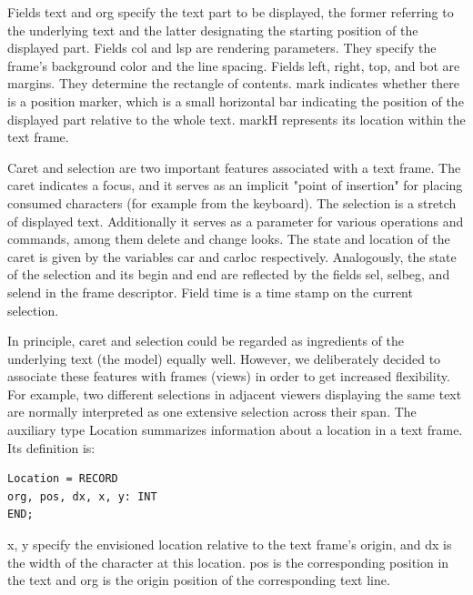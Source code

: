 Fields text and org specify the text part to be displayed, the former referring to the underlying text
and the latter designating the starting position of the displayed part. Fields col and lsp are rendering
parameters. They specify the frame's background color and the line spacing. Fields left, right, top,
and bot are margins. They determine the rectangle of contents. mark indicates whether there is a
position marker, which is a small horizontal bar indicating the position of the displayed part relative
to the whole text. markH represents its location within the text frame.

Caret and selection are two important features associated with a text frame. The caret indicates a
focus, and it serves as an implicit "point of insertion" for placing consumed characters (for example
from the keyboard). The selection is a stretch of displayed text. Additionally it serves as a
parameter for various operations and commands, among them delete and change looks. The state
and location of the caret is given by the variables car and carloc respectively. Analogously, the
state of the selection and its begin and end are reflected by the fields sel, selbeg, and selend in the
frame descriptor. Field time is a time stamp on the current selection.

In principle, caret and selection could be regarded as ingredients of the underlying text (the model)
equally well. However, we deliberately decided to associate these features with frames (views) in
order to get increased flexibility. For example, two different selections in adjacent viewers
displaying the same text are normally interpreted as one extensive selection across their span.
The auxiliary type Location summarizes information about a location in a text frame. Its definition is:
\begin{verbatim}
Location = RECORD
org, pos, dx, x, y: INT
END;
\end{verbatim}

x, y specify the envisioned location relative to the text frame's origin, and dx is the width of the
character at this location. pos is the corresponding position in the text and org is the origin position
of the corresponding text line.

